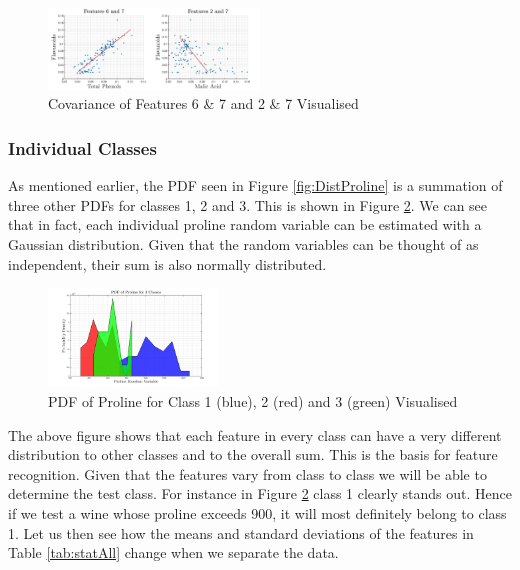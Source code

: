 \documentclass[10pt,twocolumn,letterpaper]{article}
\begin{document}
\begin{figure}[H]
\centering
\includegraphics[width=0.5\textwidth]{../results/Q1_covAll}
\caption{Covariance of Features 6 \& 7 and 2 \& 7 Visualised \label{fig:covAll}}
\end{figure}

\vspace{-5mm}

\subsubsection{Individual Classes} \label{sec:CovCla}

\indent \indent As mentioned earlier, the PDF seen in Figure \ref{fig:DistProline} is a summation of three other PDFs for classes 1, 2 and 3. This is shown in Figure \ref{fig:DistProline_Idv}. We can see that in fact, each individual proline random variable can be estimated with a Gaussian distribution. Given that the random variables can be thought of as independent, their sum is also normally distributed.

\begin{figure}[H]
\centering
\includegraphics[width=0.4\textwidth]{../results/Q1_ProlineDist_Idv}
\caption{PDF of Proline for Class 1 (blue), 2 (red) and 3 (green) Visualised \label{fig:DistProline_Idv}}
\end{figure}

The above figure shows that each feature in every class can have a very different distribution to other classes and to the overall sum. This is the basis for feature recognition. Given that the features vary from class to class we will be able to determine the test class. For instance in Figure \ref{fig:DistProline_Idv} class 1 clearly stands out. Hence if we test a wine whose proline exceeds 900, it will most definitely belong to class 1. Let us then see how the means and standard deviations of the features in Table \ref{tab:statAll} change when we separate the data.
\end{document}
